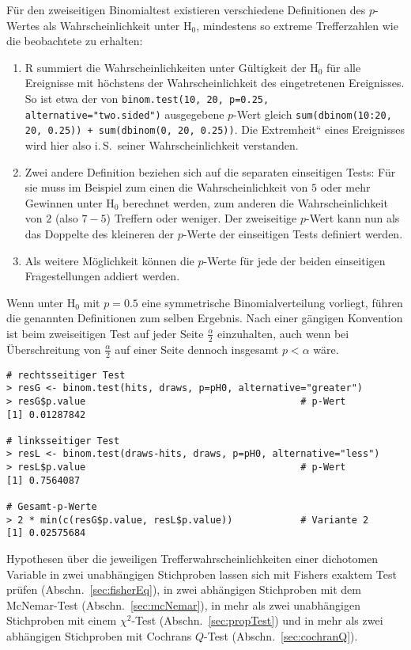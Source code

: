 Für den zweiseitigen Binomialtest existieren verschiedene Definitionen des $p$-Wertes als Wahrscheinlichkeit unter $\text{H}_{0}$, mindestens so extreme Trefferzahlen wie die beobachtete zu erhalten:
\begin{enumerate}
\item R summiert die Wahrscheinlichkeiten unter Gültigkeit der $\text{H}_{0}$ für alle Ereignisse mit höchstens der Wahrscheinlichkeit des eingetretenen Ereignisses. So ist etwa der von \lstinline!binom.test(10, 20, p=0.25, alternative="two.sided")! ausgegebene $p$-Wert gleich \lstinline!sum(dbinom(10:20, 20, 0.25)) + sum(dbinom(0, 20, 0.25))!. Die {\quotedblbase}Extremheit{\textquotedblleft} eines Ereignisses wird hier also i.\,S.\ seiner Wahrscheinlichkeit verstanden.
\item Zwei andere Definition beziehen sich auf die separaten einseitigen Tests: Für sie muss im Beispiel zum einen die Wahrscheinlichkeit von $5$ oder mehr Gewinnen unter $\text{H}_{0}$ berechnet werden, zum anderen die Wahrscheinlichkeit von $2$ (also $7-5$) Treffern oder weniger. Der zweiseitige $p$-Wert kann nun als das Doppelte des kleineren der $p$-Werte der einseitigen Tests definiert werden.
\item Als weitere Möglichkeit können die $p$-Werte für jede der beiden einseitigen Fragestellungen addiert werden.
\end{enumerate}

Wenn unter $\text{H}_{0}$ mit $p=0.5$ eine symmetrische Binomialverteilung vorliegt, führen die genannten Definitionen zum selben Ergebnis. Nach einer gängigen Konvention ist beim zweiseitigen Test auf jeder Seite $\frac{\alpha}{2}$ einzuhalten, auch wenn bei Überschreitung von $\frac{\alpha}{2}$ auf einer Seite dennoch insgesamt $p < \alpha$ wäre.
\begin{lstlisting}
# rechtsseitiger Test
> resG <- binom.test(hits, draws, p=pH0, alternative="greater")
> resG$p.value                                      # p-Wert
[1] 0.01287842

# linksseitiger Test
> resL <- binom.test(draws-hits, draws, p=pH0, alternative="less")
> resL$p.value                                      # p-Wert
[1] 0.7564087

# Gesamt-p-Werte
> 2 * min(c(resG$p.value, resL$p.value))            # Variante 2
[1] 0.02575684
\end{lstlisting}

Hypothesen über die jeweiligen Trefferwahrscheinlichkeiten einer dichotomen Variable in zwei unabhängigen Stichproben lassen sich mit Fishers exaktem Test prüfen (Abschn.\ \ref{sec:fisherEq}), in zwei abhängigen Stichproben mit dem McNemar-Test (Abschn.\ \ref{sec:mcNemar}), in mehr als zwei unabhängigen Stichproben mit einem $\chi^{2}$-Test (Abschn.\ \ref{sec:propTest}) und in mehr als zwei abhängigen Stichproben mit Cochrans $Q$-Test (Abschn.\ \ref{sec:cochranQ}).

